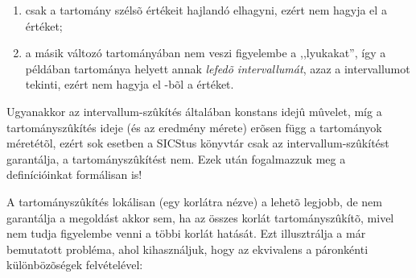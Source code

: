 \begin{enumerate}
\item csak a tartomány szélsõ értékeit hajlandó elhagyni, ezért nem hagyja el
a  értéket;
\item a másik változó tartományában nem veszi figyelembe a ,,lyukakat'', így
a példában  tartománya helyett annak \emph{lefedõ intervallumát}, azaz
a  intervallumot tekinti, ezért nem hagyja el -bõl
a  értéket.
\end{enumerate}

Ugyanakkor az intervallum-szûkítés általában konstans idejû mûvelet,
míg a tartományszûkítés ideje (és az eredmény mérete) erõsen függ a
tartományok méretétõl, ezért sok esetben a SICStus \clpfd könyvtár csak
az intervallum-szûkítést garantálja, a tartományszûkítést nem.
\br
Ezek után fogalmazzuk meg a definícióinkat formálisan is!



A tartományszûkítés lokálisan (egy korlátra nézve) a lehetõ legjobb, de
nem garantálja a megoldást akkor sem, ha az összes korlát tartományszûkítõ,
mivel nem tudja figyelembe venni a többi korlát hatását. Ezt illusztrálja
a már bemutatott  probléma, ahol
kihasználjuk, hogy az  ekvivalens a páronkénti különbözõségek
felvételével:

